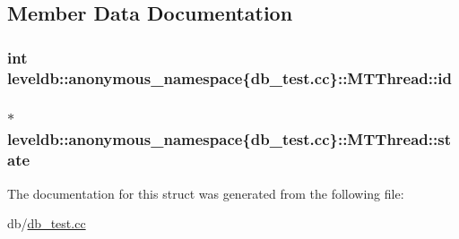 \subsection{Member Data Documentation}
\hypertarget{structleveldb_1_1anonymous__namespace_02db__test_8cc_03_1_1_m_t_thread_a012815d7d94cdcae2f6e569f7faaa70f}{}
\subsubsection[{id}]{\setlength{\rightskip}{0pt plus 5cm}int leveldb\+::anonymous\+\_\+namespace\{db\+\_\+test.\+cc\}\+::M\+T\+Thread\+::id}\label{structleveldb_1_1anonymous__namespace_02db__test_8cc_03_1_1_m_t_thread_a012815d7d94cdcae2f6e569f7faaa70f}
\hypertarget{structleveldb_1_1anonymous__namespace_02db__test_8cc_03_1_1_m_t_thread_ab1f576fac58c16544b3425aa8fccad52}{}
\subsubsection[{state}]{$\ast$ leveldb\+::anonymous\+\_\+namespace\{db\+\_\+test.\+cc\}\+::M\+T\+Thread\+::state}\label{structleveldb_1_1anonymous__namespace_02db__test_8cc_03_1_1_m_t_thread_ab1f576fac58c16544b3425aa8fccad52}


The documentation for this struct was generated from the following file\+:\begin{DoxyCompactItemize}
\item 
db/\hyperlink{db__test_8cc}{db\+\_\+test.\+cc}\end{DoxyCompactItemize}
